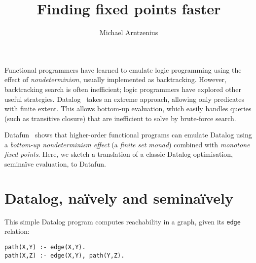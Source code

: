 \documentclass[sigplan,screen,review,timestamp,dvipsnames]{acmart}
\title{Finding fixed points faster}
\author{Michael Arntzenius}
\affiliation{University of Birmingham}
\begin{document}
\maketitle



Functional programmers have learned to emulate logic programming using the
effect of \emph{nondeterminism}, usually implemented as backtracking. However,
backtracking search is often inefficient; logic programmers have explored other
useful strategies.
%
Datalog~\citep{datalog} takes an extreme approach, allowing only predicates with
finite extent. This allows bottom-up evaluation, which easily handles queries
(such as transitive closure) that are inefficient to solve by brute-force
search.

Datafun~\cite{datafun} shows that higher-order functional programs can emulate
Datalog using a \emph{bottom-up nondeterminism effect} (a \emph{finite set
  monad}) combined with \emph{monotone fixed points}. Here, we sketch a
translation of a classic Datalog optimisation, semina\"ive evaluation, to
Datafun.


\section{Datalog, na\"ively and semina\"ively}

This simple Datalog program computes reachability in a graph, given its
\texttt{edge} relation:
%
\begin{lstlisting}
path(X,Y) :- edge(X,Y).
path(X,Z) :- edge(X,Y), path(Y,Z).
\end{lstlisting}
\end{document}

